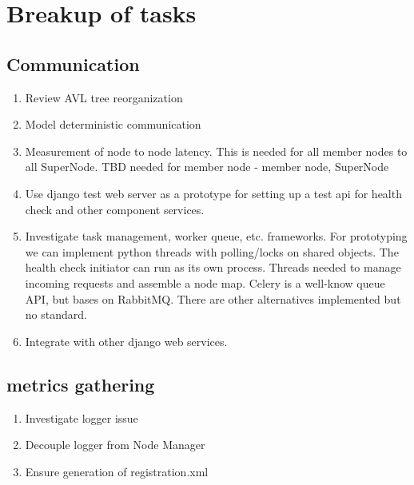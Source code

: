 \documentclass[oneside,12pt]{memoir}
\begin{document}
\section{Breakup of tasks}

\subsection{Communication}

\begin{enumerate}
\item
Review AVL tree reorganization
\item
Model deterministic communication
\item
Measurement of node to node latency.  This is needed for all member nodes to all SuperNode.  TBD  needed for member node - member node, SuperNode 
\item
Use django test web server as a prototype for setting up a test api for health check and other component services.
\item
Investigate task management, worker queue, etc.  frameworks.  For prototyping we can implement python threads with polling/locks on shared objects.  The health check initiator can run as its own process.  Threads needed to manage incoming requests and assemble a node map.  Celery is a well-know queue API, but bases on RabbitMQ.  There are other alternatives implemented but no standard.
\item
Integrate with other django web services.  


\end{enumerate}



\subsection{metrics gathering}
\begin{enumerate}
\item Investigate logger issue
\item Decouple logger from Node Manager
\item Ensure generation of registration.xml
\end{enumerate}
\end{document}
